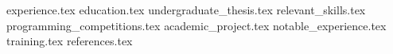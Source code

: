 \documentclass[11pt, a4papter]{awesome-cv}
\newcommand*{\sectiondir}{sections/}
\begin{document}
\makecvheader

{experience.tex}
{education.tex}
{undergraduate_thesis.tex}
{relevant_skills.tex}
{programming_competitions.tex}
{academic_project.tex}
{notable_experience.tex}
{training.tex}
{references.tex}
\end{document}
